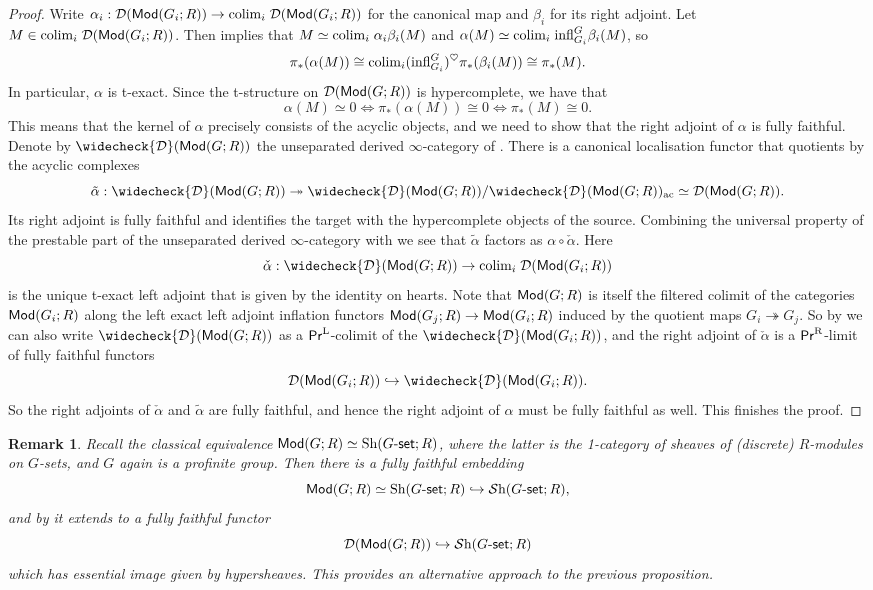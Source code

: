 \documentclass[reqno]{amsart}
\numberwithin{equation}{section}\theoremstyle{thms}
\theoremstyle{defn}
\newtheorem{rem}[equation]{Remark}
\newcommand{\cD}{\mathcal{D}}
\newcommand{\tn}[1]{\textnormal{#1}}
\newcommand{\tsf}[1]{\textsf{\textup{#1}}}
\newcommand{\mcal}[1]{\mathcal{#1}}
\newcommand{\sheaves}{\mcal{S}\tn{h}}
\newcommand{\modgr}{\tsf{Mod}(G;R)}
\newcommand{\Mod}{\tsf{Mod}}
\newcommand{\prl}{\tsf{Pr}^{\tn{L}}}
\newcommand{\prr}{\tsf{Pr}^{\tn{R}}}
\newcommand{\gset}{G\tsf{-set}}
\begin{document}
\begin{proof}
Write $\alpha_i: \cD(\Mod(G_i;R)) \to \tn{colim}_i \; \cD(\Mod(G_i;R))$ for the canonical map and $\beta_i$ for its right adjoint. Let $M \in \tn{colim}_i \; \cD(\Mod(G_i;R))$. Then \cite[Lemma 6.3.3.6]{lur09} implies that $M \simeq \tn{colim}_i \; \alpha_i \beta_i(M)$ and $\alpha(M) \simeq \tn{colim}_i \; \tn{infl}^G_{G_i} \beta_i(M)$, so
$$\pi_*(\alpha(M)) \cong \tn{colim}_i (\tn{infl}^G_{G_i})^\heartsuit \pi_*(\beta_i(M)) \cong \pi_*(M).$$
In particular, $\alpha$ is t-exact. Since the t-structure on $\cD(\modgr)$ is hypercomplete, we have that
$$\alpha(M) \simeq 0 \Leftrightarrow \pi_*(\alpha(M)) \cong 0 \Leftrightarrow \pi_*(M) \cong 0.$$
This means that the kernel of $\alpha$ precisely consists of the acyclic objects, and we need to show that the right adjoint of $\alpha$ is fully faithful. Denote by $\widecheck{\cD}(\modgr)$ the unseparated derived $\infty$-category of \cite[§C.5.8]{lur18}. There is a canonical localisation functor that quotients by the acyclic complexes
$$\tilde{\alpha}: \widecheck{\cD}(\modgr) \twoheadrightarrow  \widecheck{\cD}(\modgr)/\widecheck{\cD}(\modgr)_{\tn{ac}} \simeq \cD(\modgr).$$
Its right adjoint is fully faithful and identifies the target with the hypercomplete objects of the source. Combining the universal property of the prestable part of the unseparated derived $\infty$-category \cite[Corollary C.5.8.9]{lur18} with \cite[Proposition C.3.1.1, C.3.2.1]{lur18} we see that $\tilde{\alpha}$ factors as $\alpha \circ \check{\alpha}$. Here 
$$\check{\alpha}: \widecheck{\cD}(\modgr) \to \tn{colim}_i \; \cD(\Mod(G_i;R))$$
is the unique t-exact left adjoint that is given by the identity on hearts. Note that $\modgr$ is itself the filtered colimit of the categories $\Mod(G_i;R)$ along the left exact left adjoint inflation functors $\Mod(G_j;R) \to \Mod(G_i;R)$ induced by the quotient maps $G_i \twoheadrightarrow G_j$. So by \cite[Proposition C.5.5.20, C.3.3.5]{lur18} we can also write $\widecheck{\cD}(\modgr)$ as a $\prl$-colimit of the $\widecheck{\cD}(\Mod(G_i;R))$, and the right adjoint of $\check{\alpha}$ is a $\prr$-limit of fully faithful functors 
$$\cD(\Mod(G_i;R)) \hookrightarrow \widecheck{\cD}(\Mod(G_i;R)).$$
So the right adjoints of $\check{\alpha}$ and $\tilde{\alpha}$ are fully faithful, and hence the right adjoint of $\alpha$ must be fully faithful as well. This finishes the proof.
\end{proof}

\begin{rem}
Recall the classical equivalence $\modgr \simeq \tn{Sh}(\gset;R)$, where the latter is the 1-category of sheaves of (discrete) $R$-modules on $G$-sets, and $G$ again is a profinite group. Then there is a fully faithful embedding 
$$\modgr \simeq \tn{Sh}(\gset;R) \hookrightarrow \sheaves(\gset;R),$$
and by \cite[Corollary 2.1.2.3]{lur18} it extends to a fully faithful functor
$$\cD(\modgr) \hookrightarrow \sheaves(\gset;R)$$
which has essential image given by hypersheaves. This provides an alternative approach to the previous proposition.
\end{rem}
\end{document}
